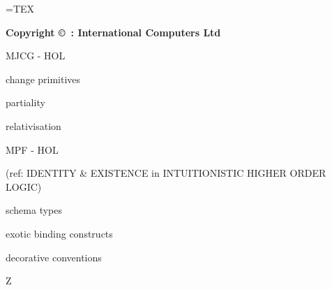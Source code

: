 =TEX
% 
\def\Hide#1{}
\def\Bool{``$\it{:}bool\,$''}
\makeindex
{}  %
\def\SCCSversion{%
}
\TPPissue{\SCCSversion}  %
\TPPdate{\FormatDate{%
}} %

\TPPclass{}


\TPPsetsizes
\makeTPPfrontpage

\vfill
\begin{centering}

\bf Copyright \copyright\ : International Computers Ltd \number\year

\end{centering}

\newpage
\begin{figure}[h]
\end{figure}

\newpage
\begin{figure}[h]
\end{figure}

\newpage
{\center\huge

\vfill

MJCG - HOL

\vfill

change primitives

\vfill

partiality

\vfill

relativisation

\vfill

MPF - HOL

(ref: IDENTITY \& EXISTENCE in INTUITIONISTIC HIGHER ORDER LOGIC)

\vfill

schema types

\vfill

exotic binding constructs

\vfill

decorative conventions

\vfill

Z

\vfill

}


